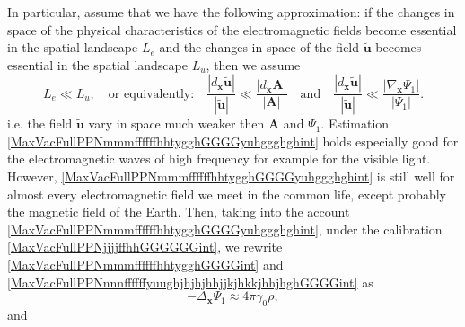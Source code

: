 \documentclass{article}
\theoremstyle{definition}
\theoremstyle{remark}
\renewcommand{\vec}[1]{\mathbf{#1}}
\newcommand{\er}{\eqref}
\newcommand{\er}{\eqref}
\begin{document}
In particular, assume that we have the following approximation: if
the changes in space of the physical characteristics of the
electromagnetic fields become essential in the spatial landscape
$L_e$ and the changes in space of the field $\vec {\tilde u}$
becomes essential in the spatial landscape $L_{u}$, then we assume
\begin{equation}\label{MaxVacFullPPNmmmffffffhhtygghGGGGyuhggghghint}
L_e\ll L_u,\quad\text{or equivalently:}\quad \frac{|d_{\vec x}\vec
{\tilde u}|}{|\vec {\tilde u}|}\ll\frac{|d_{\vec x}\vec A|}{|\vec
A|}\quad\text{and}\quad\frac{|d_{\vec x}\vec {\tilde u}|}{|\vec
{\tilde u}|}\ll\frac{|\nabla_{\vec x}\Psi_1|}{|\Psi_1|}.
\end{equation}
i.e. the field $\vec {\tilde u}$ vary in space much weaker then
$\vec A$ and $\Psi_1$. Estimation
\er{MaxVacFullPPNmmmffffffhhtygghGGGGyuhggghghint} holds especially
good for the electromagnetic waves of high frequency for example for
the visible light. However,
\er{MaxVacFullPPNmmmffffffhhtygghGGGGyuhggghghint} is still well for
almost every electromagnetic field we meet in the common life,
except probably the magnetic field of the Earth. Then, taking into
the account \er{MaxVacFullPPNmmmffffffhhtygghGGGGyuhggghghint},
under the calibration \er{MaxVacFullPPNjjjjffhhGGGGGGint}, we
rewrite \er{MaxVacFullPPNmmmffffffhhtygghGGGGint} and
\er{MaxVacFullPPNnnnffffffyuughjhjhjhhjjkjhkkjhhjhghGGGGint} as
\begin{equation}\label{MaxVacFullPPNmmmffffffhhtygghGGGGggint}
-\Delta_{\vec x}\Psi_1\approx 4\pi\gamma_0\rho,
\end{equation}
and
\end{document}
